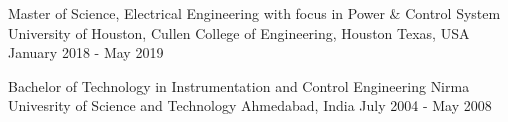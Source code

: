 \begin{cventries}
	\cvedu
	{Master of Science, Electrical Engineering with focus in Power \& Control System} %
	{University of Houston, Cullen College of Engineering, Houston} %
	{Texas, USA} %
	{January 2018 - May 2019} %
\end{cventries}
\begin{cventries}
	\cvedu
	{Bachelor of Technology in Instrumentation and Control Engineering} %
	{Nirma Univesrity of Science and Technology} %
	{Ahmedabad, India} %
	{July 2004 - May 2008} %
\end{cventries}


